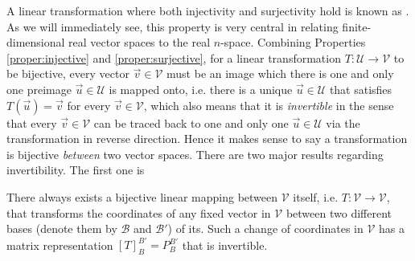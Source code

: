 A linear transformation where both injectivity and surjectivity hold is known as . As we will immediately see, this property is very central in relating finite-dimensional real vector spaces to the real $n$-space. Combining Properties \ref{proper:injective} and \ref{proper:surjective}, for a linear transformation $T: \mathcal{U} \to \mathcal{V}$ to be bijective, every vector $\vec{v} \in \mathcal{V}$ must be an image which there is one and only one preimage $\vec{u} \in \mathcal{U}$ is mapped onto, i.e. there is a unique $\vec{u} \in \mathcal{U}$ that satisfies $T(\vec{u}) = \vec{v}$ for every $\vec{v} \in \mathcal{V}$, which also means that it is \textit{invertible} in the sense that every $\vec{v} \in \mathcal{V}$ can be traced back to one and only one $\vec{u} \in \mathcal{U}$ via the transformation in reverse direction. Hence it makes sense to say a transformation is bijective \textit{between} two vector spaces. There are two major results regarding invertibility. The first one is
\begin{thm}
\label{thm:bijectivechincoord}
There always exists a bijective linear mapping between $\mathcal{V}$ itself, i.e. $T: \mathcal{V} \to \mathcal{V}$, that transforms the coordinates of any fixed vector in $\mathcal{V}$ between two different bases (denote them by $\mathcal{B}$ and $\mathcal{B}'$) of its. Such a change of coordinates in $\mathcal{V}$ has a matrix representation $[T]_B^{B'} = P_B^{B'}$ that is invertible.
\end{thm}
